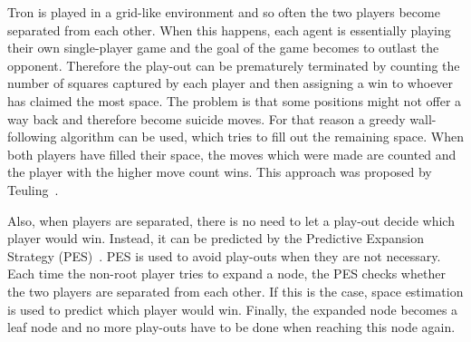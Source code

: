 \documentclass{article}
\begin{document}





Tron is played in a grid-like environment and so often the two players become separated from each other. When this happens, each agent is essentially playing their own single-player game and the goal of the game becomes to outlast the opponent. Therefore the play-out can be prematurely terminated by counting the number of squares captured by each player and then assigning a win to whoever has claimed the most space. The problem is that some positions might not offer a way back and therefore become suicide moves. For that reason a greedy wall-following algorithm can be used, which tries to fill out the remaining space. When both players have filled their space, the moves which were made are counted and the player with the higher move count wins. This approach was proposed by Teuling~\cite{teuling_tron}. %

Also, when players are separated, there is no need to let a play-out decide which player would win. Instead, it can be predicted by the Predictive Expansion Strategy (PES)~\cite{teuling_tron}. PES is used to avoid play-outs when they are not necessary. Each time the non-root player tries to expand a node, the PES checks whether the two players are separated from each other. If this is the case, space estimation is used to predict which player would win. Finally, the expanded node becomes a leaf node and no more play-outs have to be done when reaching this node again. %
\end{document}
